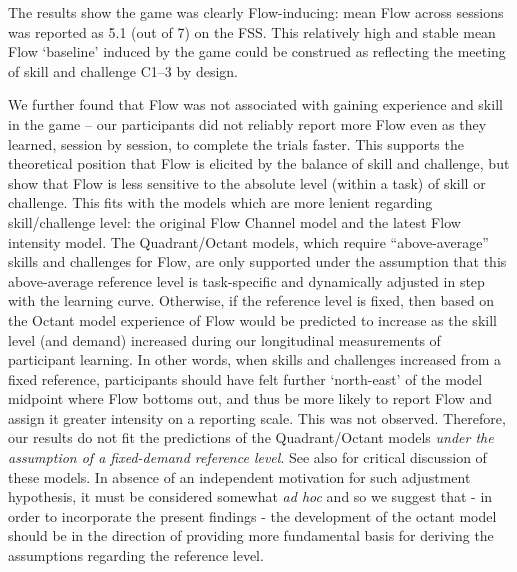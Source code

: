 \documentclass{frontierstyle/frontiersSCNS}
\begin{document}
The results show the game was clearly Flow-inducing: mean Flow across sessions was reported as 5.1 (out of 7) on the FSS. This relatively high and stable mean Flow `baseline' induced by the game could be construed as reflecting the meeting of skill and challenge {\sf C1--3} by design.

We further found that Flow was not associated with gaining experience and skill in the game -- our participants did not reliably report more Flow even as they learned, session by session, to complete the trials faster. This supports the theoretical position that Flow is elicited by the balance of skill and challenge, but show that Flow is less sensitive to the absolute level (within a task) of skill or challenge. This fits with the models which are more lenient regarding skill/challenge level: the original Flow Channel model and the latest Flow intensity model. The Quadrant/Octant models, which require ``above-average'' skills and challenges for Flow, are only supported under the assumption that this above-average reference level is task-specific and dynamically adjusted in step with the learning curve. Otherwise, if the reference level is fixed, then based on the Octant model experience of Flow would be predicted to increase as the skill level (and demand) increased during our longitudinal measurements of participant learning. In other words, when skills and challenges increased from a fixed reference, participants should have felt further `north-east' of the model midpoint where Flow bottoms out, and thus be more likely to report Flow and assign it greater intensity on a reporting scale. This was not observed. Therefore, our results do not fit the predictions of the Quadrant/Octant models {\it under the assumption of a fixed-demand reference level}. See also \cite{Keller2012} for critical discussion of these models. In absence of an independent motivation for such adjustment hypothesis, it must be considered somewhat {\it ad hoc} and so we suggest that - in order to incorporate the present findings - the development of the octant model should be in the direction of providing more fundamental basis for deriving the assumptions regarding the reference level.
\end{document}
